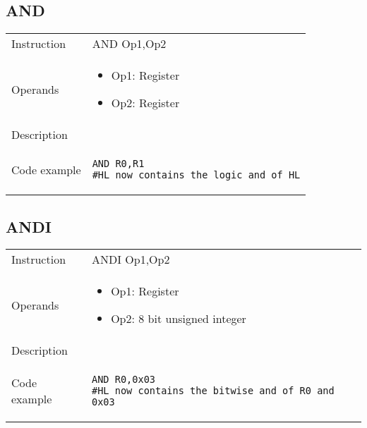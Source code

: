 \subsection{AND}
\renewcommand*{\arraystretch}{2.0}
\begin{longtable}{P{3cm}P{9cm}}
\midrule
\noindent Instruction & AND Op1,Op2 \\
\noindent Operands &
\begin{itemize}[label={},noitemsep,leftmargin=*,topsep=0pt,partopsep=0pt, itemsep=1em]
\item Op1: Register
\item Op2: Register
\end{itemize}\\
\noindent Description &  \\
\noindent Code example & 
\begin{lstlisting}
AND R0,R1
#HL now contains the logic and of HL
\end{lstlisting} \\
\end{longtable}


\subsection{ANDI}
\renewcommand*{\arraystretch}{2.0}
\begin{longtable}{P{3cm}P{9cm}}
\midrule
\noindent Instruction & ANDI Op1,Op2 \\
\noindent Operands &
\begin{itemize}[label={},noitemsep,leftmargin=*,topsep=0pt,partopsep=0pt, itemsep=1em]
\item Op1: Register
\item Op2: 8 bit unsigned integer
\end{itemize}\\
\noindent Description &  \\
\noindent Code example & 
\begin{lstlisting}
AND R0,0x03
#HL now contains the bitwise and of R0 and 0x03
\end{lstlisting} \\
\end{longtable}

\newpage

